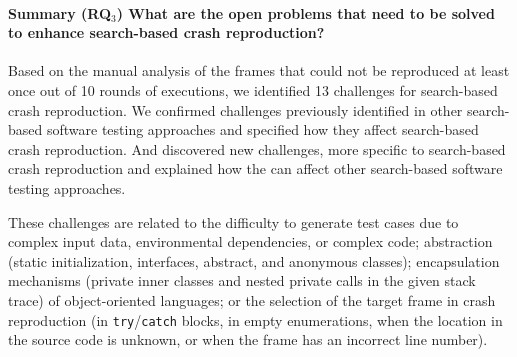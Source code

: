 \paragraph{\textbf{Summary (RQ$_3$)} What are the open problems that need to be solved to enhance search-based crash reproduction?}

Based on the manual analysis of the frames that could not be reproduced at least once out of 10 rounds of executions, we identified 13 challenges for search-based crash reproduction.
We confirmed challenges previously identified in other search-based software testing approaches and specified how they affect search-based crash reproduction. And discovered new challenges, more specific to search-based crash reproduction and explained how the can affect other search-based software testing approaches. 

These challenges are related to the difficulty to generate test cases due to complex input data, environmental dependencies, or complex code; abstraction (static initialization, interfaces, abstract, and anonymous classes); encapsulation mechanisms (private inner classes and nested private calls in the given stack trace) of object-oriented languages; or the selection of the target frame in crash reproduction (in \texttt{try}/\texttt{catch} blocks, in empty enumerations, when the location in the source code is unknown, or when the frame has an incorrect line number).
